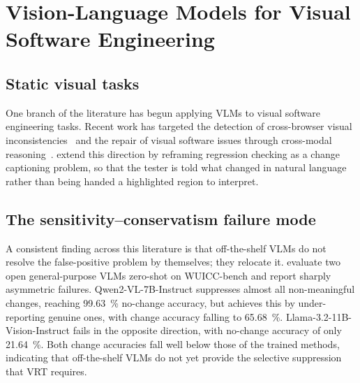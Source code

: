 \section{Vision-Language Models for Visual Software Engineering}
\label{sec:vlm-se}

\subsection{Static visual tasks}
\label{sec:vlm-static}

One branch of the literature has begun applying VLMs to visual software
engineering tasks. Recent work has targeted the detection of cross-browser
visual inconsistencies~\citep{xbidetective} and the repair of visual
software issues through cross-modal reasoning~\citep{seeingisfixing}.
\citet{zhang2026beyond} extend this direction by reframing
regression checking as a change captioning problem, so that the tester is
told what changed in natural language rather than being handed a
highlighted region to interpret.

\subsection{The sensitivity--conservatism failure mode}
\label{sec:vlm-failure}

A consistent finding across this literature is that off-the-shelf VLMs do
not resolve the false-positive problem by themselves; they relocate it.
\citet{zhang2026beyond} evaluate two open general-purpose VLMs
zero-shot on WUICC-bench and report sharply asymmetric failures.
Qwen2-VL-7B-Instruct suppresses almost all non-meaningful changes,
reaching \SI{99.63}{\percent} no-change accuracy, but achieves this by
under-reporting genuine ones, with change accuracy falling to
\SI{65.68}{\percent}. Llama-3.2-11B-Vision-Instruct fails in the opposite
direction, with no-change accuracy of only \SI{21.64}{\percent}. Both
change accuracies fall well below those of the trained methods,
indicating that off-the-shelf VLMs do not yet provide the selective
suppression that VRT requires.

